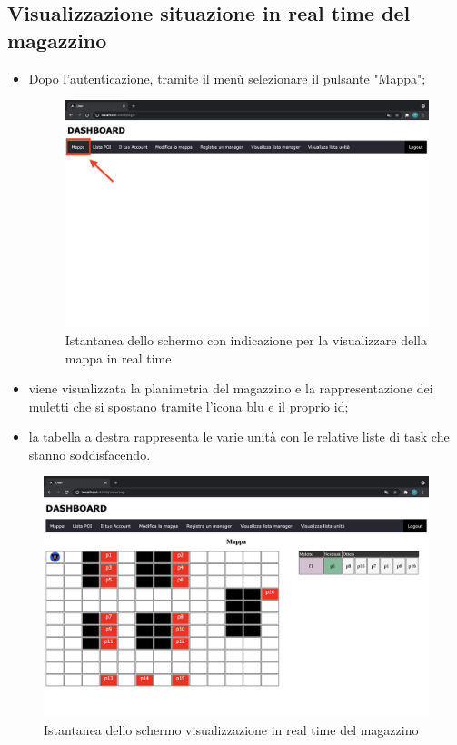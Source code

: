 \subsection{Visualizzazione situazione in real time del magazzino}
\begin{itemize}
    \item Dopo l'autenticazione, tramite il menù selezionare il pulsante "Mappa";
    \begin{figure}[H]
        \centering
        \includegraphics[scale=0.12]{res/images/dashboard1.png}
        \caption{Istantanea dello schermo con indicazione per la visualizzare della mappa in real time}
    \end{figure}
    \item viene visualizzata la planimetria del magazzino e la rappresentazione dei muletti che si spostano tramite l'icona blu e il proprio id;
    \item la tabella a destra rappresenta le varie unità con le relative liste di task che stanno soddisfacendo.
    
\end{itemize}

\begin{figure}[H]
    \centering
    \includegraphics[scale=0.12]{res/images/map_user.png}
    \caption{Istantanea dello schermo visualizzazione in real time del magazzino}
\end{figure}

